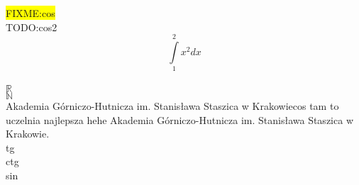 \documentclass{article}
\newcommand{\fixme}[1]{\colorbox{yellow}{FIXME:#1}}
\newcommand{\todo}[1]{\colorbox{red!20}{TODO:#1}}
\newcommand{\myint}[3]{\int\limits_{#1}^{#2}#3dx}
\def \R {$\mathbb{R}$}
\def \N {$\mathbb{N}$}
\def \agh {Akademia Górniczo-Hutnicza im. Stanisława Staszica w Krakowie}
\def \tg {tg}
\def \ctg {ctg}
\def \sin {sin}
\begin{document}
\fixme{cos}\\
\todo{cos2}\\
$$\myint{1}{2}{x^2}$$\\
\R\\
\N\\
\agh cos tam to uczelnia najlepsza hehe \agh. \\
\tg\\
\ctg\\
\sin\\
\end{document}

